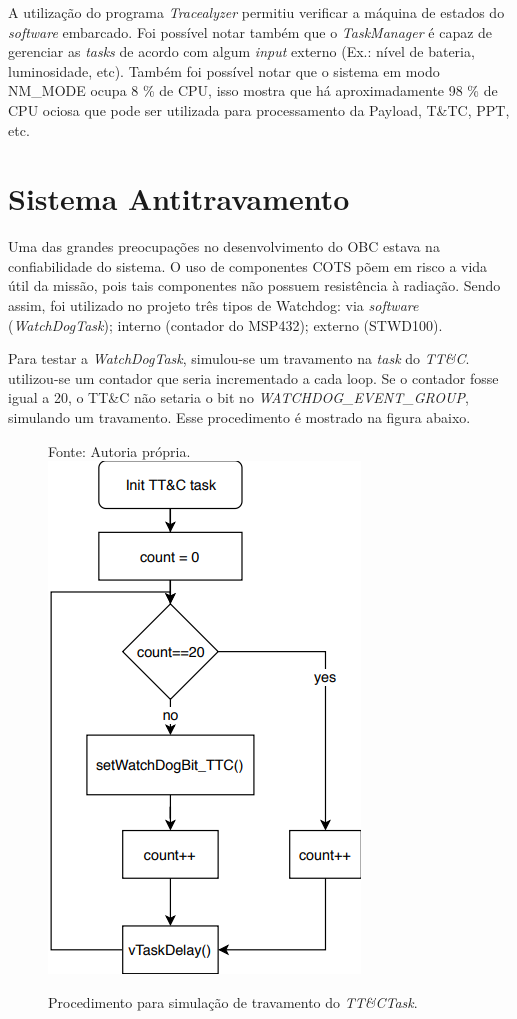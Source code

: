 A utilização do programa \textit{Tracealyzer} permitiu verificar a máquina de estados do \textit{software} embarcado. Foi possível notar também que o \textit{TaskManager} é capaz de gerenciar as \textit{tasks} de acordo com algum \textit{input} externo (Ex.: nível de bateria, luminosidade, etc). Também foi possível notar que o sistema em modo NM\_MODE ocupa 8 \%  de CPU, isso mostra que há aproximadamente 98 \% de CPU ociosa que pode ser utilizada para processamento da Payload, T\&TC, PPT, etc.

\section{Sistema Antitravamento}

Uma das grandes preocupações no desenvolvimento do OBC estava na confiabilidade do sistema. O uso de componentes COTS põem em risco a vida útil da missão, pois tais componentes não possuem resistência à radiação. Sendo assim, foi utilizado no projeto três tipos de Watchdog: via \textit{software} (\textit{WatchDogTask}); interno (contador do MSP432); externo (STWD100).

Para testar a \textit{WatchDogTask}, simulou-se um travamento na \textit{task} do \textit{TT\&C}. utilizou-se um contador que seria incrementado a cada loop. Se o contador fosse igual a 20, o TT\&C não setaria o bit no \textit{WATCHDOG\_EVENT\_GROUP}, simulando um travamento. Esse procedimento é mostrado na figura abaixo.  

\begin{figure}[h]
\footnotesize{	
	\centering
			\centering
	\footnotesize{Fonte: Autoria própria.}
	\newline
	\includegraphics[keepaspectratio=true,scale=0.63]{figuras/workflow_test_WTD.PNG}
	\caption{Procedimento para simulação de travamento do \textit{TT\&CTask}.}	
	\label{watchDogFreeRTOS_0}
}
\end{figure}
\FloatBarrier

